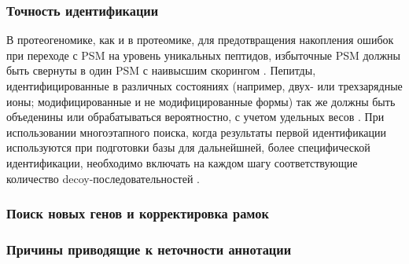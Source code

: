 \subsubsection{Точность идентификации}
В протеогеномике, как и в протеомике, для предотвращения накопления ошибок при переходе с PSM на уровень уникальных пептидов, избыточные PSM должны быть свернуты в один PSM с наивысшим скорингом \cite{nesvizhskii2010survey}. Пепитды, идентифицированные в различных состояниях (например, двух- или трехзарядные ионы; модифицированные и не модифицированные формы) так же должны быть объеденины или обрабатываться вероятностно, с учетом удельных весов \cite{shteynberg2011iprophet}. При использовании многоэтапного поиска, когда результаты первой идентификации используются при подготовки базы для дальнейшней, более специфической идентификации, необходимо включать на каждом шагу соответствующие количество decoy-последовательностей \cite{nesvizhskii2010survey}.


\subsubsection{Поиск новых генов и корректировка рамок}
\subsubsection{Причины приводящие к неточности аннотации}

\newpage

